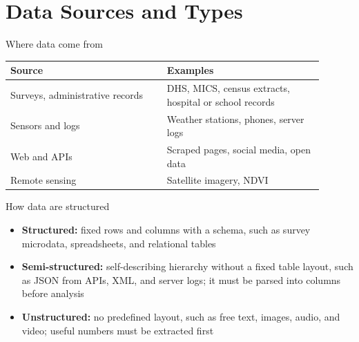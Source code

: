 \section{Data Sources and Types}


\begin{frame}{Where data come from}
    \centering
    \begin{tabular}{@{}p{0.45\linewidth}p{0.45\linewidth}@{}}
        \toprule
        Source & Examples \\
        \midrule
        Surveys, administrative records & DHS, MICS, census extracts, hospital or school records \\
        Sensors and logs & Weather stations, phones, server logs \\
        Web and APIs & Scraped pages, social media, open data \\
        Remote sensing & Satellite imagery, NDVI \\
        \bottomrule
    \end{tabular}
\end{frame}


\begin{frame}{How data are structured}
    \begin{itemize}
        \item \textbf{Structured:} fixed rows and columns with a schema, such as survey microdata, spreadsheets, and relational tables
        \item \textbf{Semi-structured:} self-describing hierarchy without a fixed table layout, such as JSON from APIs, XML, and server logs; it must be parsed into columns before analysis
        \item \textbf{Unstructured:} no predefined layout, such as free text, images, audio, and video; useful numbers must be extracted first
    \end{itemize}
\end{frame}


